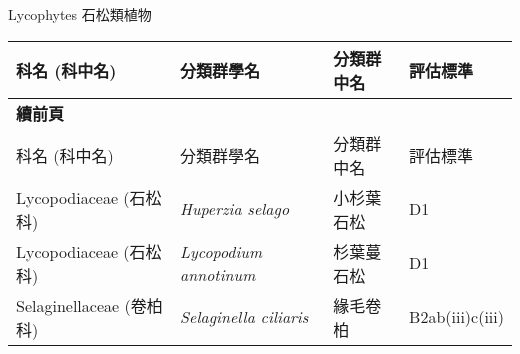 \noindent\normalfont\selectfont Lycophytes 石松類植物
\footnotesize\selectfont
        \begin{longtable}{p{3cm}p{5cm}p{3cm}p{4cm}}
        \toprule
          科名 (科中名) & 分類群學名 & 分類群中名 & 評估標準 \\
        \midrule 
        \endfirsthead

        {{\bfseries 續前頁 }} \\
        科名 (科中名) & 分類群學名 & 分類群中名 & 評估標準 \\
        \midrule
        \endhead
                Lycopodiaceae (石松科) & \textit{Huperzia selago}  & 小杉葉石松 & D1 \index{Huperzia@\textit{Huperzia}!selago@\textit{selago}}  \index{小杉葉石松} \\
    Lycopodiaceae (石松科) & \textit{Lycopodium annotinum}  & 杉葉蔓石松 & D1 \index{Lycopodium@\textit{Lycopodium}!annotinum@\textit{annotinum}}  \index{杉葉蔓石松} \\
    Selaginellaceae (卷柏科) & \textit{Selaginella ciliaris}  & 緣毛卷柏 & B2ab(iii)c(iii) \index{Selaginella@\textit{Selaginella}!ciliaris@\textit{ciliaris}}  \index{緣毛卷柏} \\
    \bottomrule
        \end{longtable}
